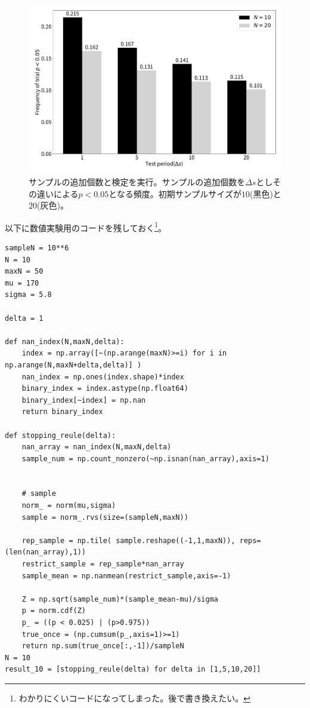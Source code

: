 \begin{figure}
  \begin{center}
    \includegraphics[width=15cm]{./image/04_/multiple_test_additional_sample.pdf}
    \caption{サンプルの追加個数と検定を実行。サンプルの追加個数を$\Delta s$としその違いによる$p<0.05$となる頻度。初期サンプルサイズが$10$(黒色)と$20$(灰色)。}
        \label{fig:multiple_test_additional_sample}
    \end{center}
\end{figure}

以下に数値実験用のコードを残しておく\footnote{わかりにくいコードになってしまった。後で書き換えたい。}。
\begin{lstlisting}
sampleN = 10**6
N = 10
maxN = 50
mu = 170
sigma = 5.8

delta = 1

def nan_index(N,maxN,delta):
    index = np.array([~(np.arange(maxN)>=i) for i in np.arange(N,maxN+delta,delta)] )
    nan_index = np.ones(index.shape)*index
    binary_index = index.astype(np.float64)
    binary_index[~index] = np.nan
    return binary_index

def stopping_reule(delta):
    nan_array = nan_index(N,maxN,delta)
    sample_num = np.count_nonzero(~np.isnan(nan_array),axis=1)


    # sample
    norm_ = norm(mu,sigma)
    sample = norm_.rvs(size=(sampleN,maxN))

    rep_sample = np.tile( sample.reshape((-1,1,maxN)), reps= (len(nan_array),1))
    restrict_sample = rep_sample*nan_array
    sample_mean = np.nanmean(restrict_sample,axis=-1)

    Z = np.sqrt(sample_num)*(sample_mean-mu)/sigma
    p = norm.cdf(Z)
    p_ = ((p < 0.025) | (p>0.975))
    true_once = (np.cumsum(p_,axis=1)>=1)
    return np.sum(true_once[:,-1])/sampleN
N = 10
result_10 = [stopping_reule(delta) for delta in [1,5,10,20]]
\end{lstlisting}


